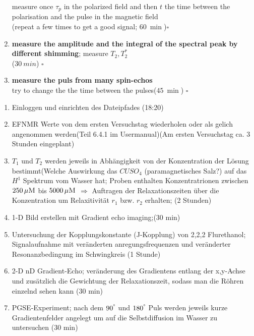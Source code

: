 \begin{enumerate}
        measure once $\tau_p$ in the polarized field and then $t$ the time between the polarisation and the pulse in the magnetic field\\  (repeat a few times to get a good signal; $\SI{60}{\min}$)$\square$
        \item \textbf{measure the amplitude and the integral of the spectral peak by different shimming}; measure $T_2,T_2^{\ast}$\\
        ($\SI{30}{min}$) $\square$
        \item \textbf{measure the puls from many spin-echos}\\
        try to change the the time between the pulses($\SI{45}{\min}$) $\square$
        
        
    \end{enumerate}
    \newpage
    \begin{enumerate}
        \item Einloggen und einrichten des Dateipfades (18:20)
        \item EFNMR Werte von dem ersten Versuchstag wiederholen oder als gelich angenommen werden(Teil 6.4.1 im Usermanual)(Am ersten Versuchstag ca. 3 Stunden eingeplant)
        \item $T_1$ und $T_2$ werden jeweils in Abhängigkeit von der Konzentration der Lösung bestimmt(Welche Auswirkung das $CUSO_4$ (paramagnetisches Salz?) auf das $H^1$ Spektrum vom Wasser hat; Proben enthalten  Konzentratrionen zwischen $\SI{250}{\mu \textsc{M}}$ bis $\SI{5000}{\mu \textsc{M}}$ $\Longrightarrow$ Auftragen der Relaxationszeiten über die Konzentration um Relaxitivität $r_1$ bzw. $r_2$ erhalten; (2 Stunden)
        \item 1-D Bild erstellen mit Gradient echo imaging;(30 min)
        \item Untersuchung der Kopplungskonstante (J-Kopplung) von 2,2,2 Flurethanol; Signalaufnahme mit veränderten anregungsfrequenzen und veränderter Resonanzbedingung im Schwingkreis (1 Stunde)
        \item 2-D nD Gradient-Echo; veränderung des Gradientens entlang der x,y-Achse und zusätzlich die Gewichtung der Relaxationszeit, sodass man die Röhren einzelnd sehen kann (30 min)
        \item PGSE-Experiment; nach dem $90^{\degree}$ und $180^{\degree}$ Puls werden jeweils kurze Gradientenfelder angelegt um auf die Selbstdiffusion im Wasser zu untersuchen (30 min)
        \end{enumerate}
